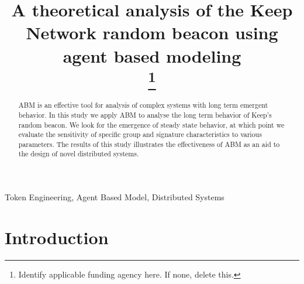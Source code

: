 \documentclass[conference]{IEEEtran}
\begin{document}
\title{A theoretical analysis of the Keep Network random beacon using agent based modeling \\
\thanks{Identify applicable funding agency here. If none, delete this.}
}

\author{

\and
{}

\and
{}

\and
{}

\and
{}
}

\maketitle

\begin{abstract}
    ABM is an effective tool for analysis of complex systems with long term 
    emergent behavior. In this study we apply ABM to analyse the long term 
    behavior of Keep’s random beacon. We look for the emergence of steady 
    state behavior, at which point we evaluate the sensitivity of specific 
    group and signature characteristics to various parameters. The results 
    of this study illustrates the effectiveness of ABM as an aid to the design 
    of novel distributed systems. 

\end{abstract}

\begin{IEEEkeywords}
Token Engineering, Agent Based Model, Distributed Systems
\end{IEEEkeywords}

\section{Introduction}
\end{document}
